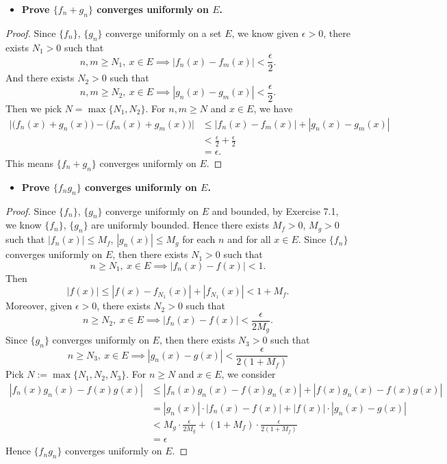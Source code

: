 \begin{Exercise}
	\begin{itemize}
		\item \textbf{Prove $\{f_n+g_n\}$ converges uniformly on $E$.}
	\end{itemize}
	\begin{proof}
		Since $\{f_n\}$, $\{g_n\}$ converge uniformly on a set $E$, we know given $\epsilon>0$, there exists $N_1>0$ such that
		$$
		n,m\geq N_1,\ x\in E \implies |f_n(x) - f_m(x)| < \frac{\epsilon}{2}.
		$$
		And there exists $N_2>0$ such that
		$$
		n,m\geq N_2,\ x\in E \implies |g_n(x) - g_m(x)| < \frac{\epsilon}{2}.
		$$
		Then we pick $N = \max\{N_1,N_2\}$. For $n,m\geq N$ and $x\in E$, we have
		\begin{align*}
		\Big| \big( f_n(x) + g_n(x) \big) - \big( f_m(x) + g_m(x) \big) \Big|
		&\leq | f_n(x) - f_m(x) | + | g_n(x) - g_m(x) | \\
		&< \frac{\epsilon}{2} + \frac{\epsilon}{2} \\
		&= \epsilon.
		\end{align*}
		This means $\{f_n + g_n\}$ converges uniformly on $E$.
	\end{proof}
	
	\begin{itemize}
		\item \textbf{Prove $\{f_n g_n\}$ converges uniformly on $E$.}
	\end{itemize}
	\begin{proof}
		Since $\{f_n\}$, $\{g_n\}$ converge uniformly on $E$ and bounded, by Exercise 7.1, we know $\{f_n\}$, $\{g_n\}$ are uniformly bounded.
		Hence there exists $M_f > 0$, $M_g > 0$ such that $|f_n(x)| \leq M_f$, $|g_n(x)| \leq M_g$ for each $n$ and for all $x\in E$.
		Since $\{f_n\}$ converges uniformly on $E$, then there exists $N_1 > 0$ such that
		$$
		n\geq N_1,\ x\in E \implies |f_n(x) - f(x)| < 1.
		$$
		Then
		$$
		|f(x)| 
		\leq |f(x) - f_{N_1}(x)| + |f_{N_1}(x)| 
		<  1 + M_f.
		$$
		Moreover, given $\epsilon>0$, there exists $N_2 > 0$ such that
		$$
		n\geq N_2,\ x\in E \implies |f_n(x) - f(x)| < \frac{\epsilon}{2M_g}.
		$$
		Since $\{g_n\}$ converges uniformly on $E$, then there exists $N_3 > 0$ such that
		$$
		n\geq N_3,\ x\in E \implies |g_n(x) - g(x)| < \frac{\epsilon}{2(1+M_f)}
		$$
		Pick $N := \max\{N_1,N_2,N_3\}$.
		For $n\geq N$ and $x\in E$, we consider
		\begin{align*}
		|f_n(x) g_n(x) - f(x) g(x)|
		&\leq |f_n(x) g_n(x) - f(x) g_n(x)| + |f(x) g_n(x) - f(x) g(x)| \\
		&= |g_n(x)| \cdot |f_n(x) - f(x)| + |f(x)| \cdot |g_n(x) - g(x)| \\
		&< M_g \cdot \frac{\epsilon}{2M_g} + (1+M_f) \cdot \frac{\epsilon}{2(1+M_f)} \\
		&= \epsilon
		\end{align*}
		Hence $\{f_n g_n\}$ converges uniformly on $E$.
	\end{proof}
\end{Exercise}